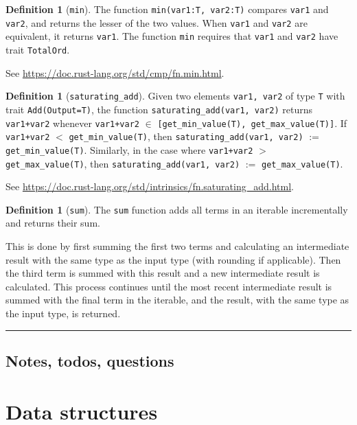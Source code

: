 \documentclass[11pt,a4paper]{article}
\theoremstyle{definition}
\newtheorem{definition}[theorem]{Definition}
\newcommand{\horizline}{\noindent\rule{\textwidth}{1pt}}
\newcommand{\inRust}[2]{See \url{#2}.}
\begin{document}
\begin{definition}[\texttt{min}]
    The function \texttt{min(var1:T, var2:T)} compares \texttt{var1} and \texttt{var2}, and returns the lesser of the two values. When \texttt{var1} and \texttt{var2} are equivalent, it returns \texttt{var1}. The function \texttt{min} requires that \texttt{var1} and \texttt{var2} have trait \texttt{TotalOrd}. 
    
    \inRust{std::cmp::min}{https://doc.rust-lang.org/std/cmp/fn.min.html}
\end{definition}

\begin{definition}[\texttt{saturating\_add}]
    \label{defn:fn-saturating-add}
    Given two elements \texttt{var1, var2} of type \texttt{T} with trait \texttt{Add(Output=T)}, the function  \texttt{saturating\_add(var1, var2)} returns \texttt{var1+var2} whenever \texttt{var1+var2} $\in$ \texttt{[get\_min\_value(T), get\_max\_value(T)]}. If \texttt{var1+var2} $<$ \texttt{get\_min\_value(T)}, then \texttt{saturating\_add(var1, var2)} $:=$ \texttt{get\_min\_value(T)}. Similarly, in the case where \texttt{var1+var2} $>$ \texttt{get\_max\_value(T)}, then \texttt{saturating\_add(var1, var2)} $:=$ \texttt{get\_max\_value(T)}. 
    
    \inRust{std::intrinsics::saturating\_add}{https://doc.rust-lang.org/std/intrinsics/fn.saturating_add.html}
\end{definition}

\begin{definition}[\texttt{sum}]
    The \texttt{sum} function adds all terms in an iterable incrementally and returns their sum.
    
    This is done by first summing the first two terms and calculating an intermediate result with the same type as the input type (with rounding if applicable). Then the third term is summed with this result and a new intermediate result is calculated. This process continues until the most recent intermediate result is summed with the final term in the iterable, and the result, with the same type as the input type, is returned.
\end{definition}

\horizline

\subsection{Notes, todos, questions}

\section{Data structures}
\end{document}
